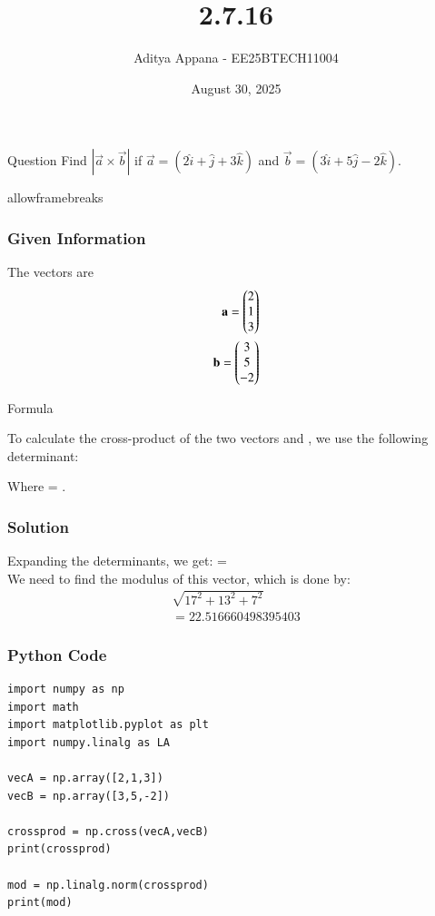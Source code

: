 \documentclass{beamer}
\title %
{2.7.16}
\date{August 30, 2025}
\author %
{Aditya Appana - EE25BTECH11004}
\begin{document}
\frame{\titlepage}
\begin{frame}{Question}
Find $|\vec{a}\times \vec{b}|$ if $\vec{a} = (2\hat{i} +\hat{j} +3\hat{k})$ and  $ \vec{b}=(3\hat{i} + 5\hat{j} - 2\hat{k})$.
\end{frame}
\begin{frame}{allowframebreaks}
\frametitle{Given Information}

    \centering
    
    \label{tab:parameters}
    The vectors are
\begin{align} 
\mathbf{a} = \begin{pmatrix}2\\1\\3\end{pmatrix}\\
\mathbf{b} = \begin{pmatrix}3\\5\\-2\end{pmatrix}
\end{align}
\end{frame}

\begin{frame}{Formula}

To calculate the cross-product of the two vectors  and , we use the following determinant:
\begin{center}
\end{center}


Where  = .

\end{frame}


\begin{frame}[fragile]
    \frametitle{Solution}

Expanding the determinants, we get: 
 =  \\
We need to find the modulus of this vector, which is done by:
\begin{align}
\sqrt{17^2+13^2+7^2} \\
=22.516660498395403
\end{align}


\end{frame}


\begin{frame}[fragile]
    \frametitle{Python Code}
    \begin{lstlisting}
import numpy as np
import math
import matplotlib.pyplot as plt
import numpy.linalg as LA

vecA = np.array([2,1,3])
vecB = np.array([3,5,-2])

crossprod = np.cross(vecA,vecB)
print(crossprod)

mod = np.linalg.norm(crossprod)
print(mod)

\end{lstlisting}
\end{frame}
\end{document}
